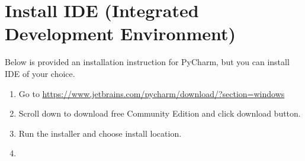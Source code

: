 \documentclass[a4paper,12pt]{book}
\begin{document}
\section{Install IDE (Integrated Development Environment)}
Below is provided an installation instruction for PyCharm, but you can install IDE of your choice.
\begin{enumerate}
	\item Go to \url{https://www.jetbrains.com/pycharm/download/?section=windows}
	\item \begin{minipage}[t]{\linewidth}
		\raggedright
		\medskip	
	\end{minipage}
	Scroll down to download free Community Edition and click download button.
	\item \begin{minipage}[t]{\linewidth}
		\raggedright
		\medskip	
	\end{minipage}
	Run the installer and choose install location.
	\item \begin{minipage}[t]{\linewidth}

\end{minipage}
\end{enumerate}
\end{document}
